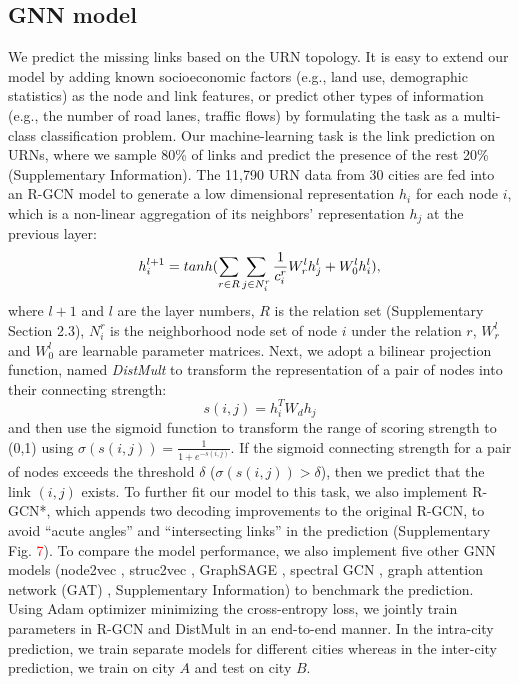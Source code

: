 \documentclass[10pt]{wlscirep}
\begin{document}
\subsection*{GNN model}
We predict the missing links based on the URN topology. It is easy to extend our model by adding known socioeconomic factors (e.g., land use, demographic statistics) as the node and link features, or predict other types of information (e.g., the number of road lanes, traffic flows) by formulating the task as a multi-class classification problem. Our machine-learning task is the link prediction on URNs, where we sample 80\% of links and predict the presence of the rest 20\% (Supplementary Information). The 11,790 URN data from 30 cities are fed into an R-GCN model to generate a low dimensional representation $h_{i}$ for each node $i$, which is a non-linear aggregation of its neighbors’ representation $h_{j}$ at the previous layer:
{\setlength\abovedisplayskip{8pt}
\setlength\belowdisplayskip{8pt}
\begin{equation}\centering
    h_{i}^{l+1} = tanh(\sum_{r \in R}\sum_{j \in N_{i}^{r}}\frac{1}{c_{i}^{r}}W_{r}^{l}h_{j}^{l}+W_{0}^{l}h_{i}^{l}),
\end{equation}}
where $l+1$ and $l$ are the layer numbers, $R$ is the relation set (Supplementary Section 2.3), $N_{i}^{r}$ is the neighborhood node set of node $i$ under the relation $r$, $W_{r}^{l}$ and $W_{0}^{l}$ are learnable parameter matrices.
Next, we adopt a bilinear projection function, named \textit{DistMult} \cite{yang2014embedding} to transform the representation of a pair of nodes into their connecting strength:
{\setlength\abovedisplayskip{8pt}
\setlength\belowdisplayskip{8pt}
\begin{equation}
    s(i,j)=h_{i}^{T}W_{d}h_{j}
\end{equation}}
and then use the sigmoid function to transform the range of scoring strength to (0,1) using $\sigma(s(i,j)) = \frac{1}{1+e^{-s(i,j)}}$.
If the sigmoid connecting strength for a pair of nodes exceeds the threshold $\delta$ ($\sigma(s(i,j))>\delta$), then we predict that the link $(i,j)$ exists. To further fit our model to this task, we also implement R-GCN*, which appends two decoding improvements to the original R-GCN, to avoid “acute angles” and “intersecting links” in the prediction (Supplementary Fig. \textcolor{red}{7}). To compare the model performance, we also implement five other GNN models (node2vec \cite{grover2016node2vec}, struc2vec \cite{ribeiro2017struc2vec}, GraphSAGE \cite{kipf2016semi}, spectral GCN \cite{hamilton2017inductive}, graph attention network (GAT) \cite{velivckovic2017graph}, Supplementary Information) to benchmark the prediction. Using Adam optimizer \cite{kingma2014adam} minimizing the cross-entropy loss, we jointly train parameters in R-GCN and DistMult in an end-to-end manner. In the intra-city prediction, we train separate models for different cities whereas in the inter-city prediction, we train on city $A$ and test on city $B$. 
\end{document}
